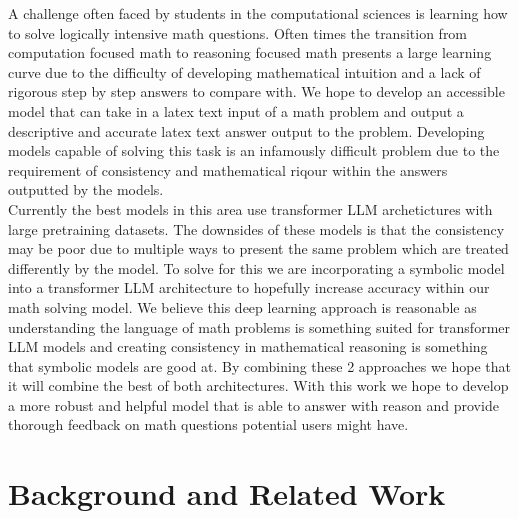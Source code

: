 \documentclass{article}
\begin{document}
A challenge often faced by students in the computational sciences 
is learning how to solve logically intensive math questions. 
Often times the transition from computation focused math to reasoning 
focused math presents a large learning curve due to the difficulty of 
developing mathematical intuition and a lack of rigorous step by step 
answers to compare with. We hope to develop an accessible model that can 
take in a latex text input of a math problem and output a descriptive and accurate latex text answer output to the problem. 
Developing models capable of solving this task is an infamously difficult problem \cite{Ünsal_Gehr_Vechev_2024} due to the requirement of consistency and mathematical riqour within the answers outputted by the models. 
\\
Currently the best models in this area use transformer LLM archetictures with large pretraining datasets. 
The downsides of these models is that the consistency may be poor due to multiple ways to present the same problem which are treated differently by the model.
To solve for this we are incorporating a symbolic model into a transformer LLM architecture to hopefully increase accuracy within our math solving model.
 We believe this deep learning approach is reasonable as understanding the language of math problems is something suited for transformer LLM models and creating consistency in mathematical reasoning is something that symbolic models are good at. By combining these 2 approaches we hope that it will combine the best of both architectures.  With this work we hope to develop a more robust and helpful model that is able to answer with reason and provide thorough feedback on math questions potential users might have.

 \section{Background and Related Work}

\end{document}
